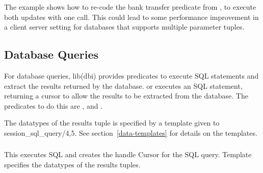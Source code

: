 The example shows how to re-code the bank transfer predicate from
,
to execute
both updates with one call. This could lead to some performance
improvement in a client server setting for databases that supports multiple
parameter tuples.

\subsection{Database Queries}

For database queries, lib(dbi) provides predicates to execute SQL
statements and extract the results returned by the database.
 or
executes an SQL statement, returning a cursor to allow the results to be
extracted from the database. The predicates to do this are
,
 and
.

The datatypes of the results tuple is specified by a template given to
session_sql_query/4,5. See section~\ref{data-templates} for details on the
templates.  

\subsubsection
{}
\label{session-sql-query/5}

This executes SQL and creates the handle Cursor for the SQL query. Template
specifies the datatypes of the results tuples.

\subsubsection
{}
\label{cursor-next-tuple/2}

